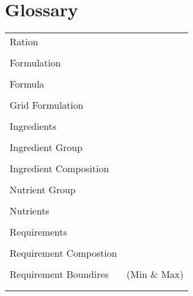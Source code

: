 \section{Glossary}
\begin{tabular}{p{8cm}p{11cm}}
Ration &  \\
\\
Formulation &  \\
\\
Formula &  \\
\\
Grid Formulation &  \\
\\
Ingredients &  \\
\\
Ingredient Group &  \\
\\
Ingredient Composition &  \\
\\
Nutrient Group &  \\
\\
Nutrients &  \\
\\
Requirements &  \\
\\
Requirement Compostion &  \\
\\
Requirement Boundires & (Min \& Max)  \\
\\

\\

\end{tabular}